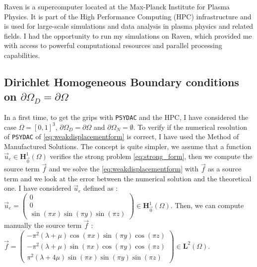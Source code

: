 \documentclass[a4paper,12pt,twoside]{report}
\begin{document}
Raven is a supercomputer located at the Max-Planck Institute for Plasma Physics. It is part of the High Performance Computing (HPC) infrastructure and is used for large-scale simulations and data analysis in plasma physics and related fields. I had the opportunity to run my simulations on Raven, which provided me with access to powerful computational resources and parallel processing capabilities. 


\subsection{Dirichlet Homogeneous Boundary conditions on $\partial\Omega_D = \partial\Omega$} \label{subsec:Dirichlet Homogeneous Boundary conditions on}

In a first time, to get the grips with \texttt{PSYDAC} and the HPC, I have considered the case $\Omega = [0,1]^3$, $\partial \Omega_D = \partial\Omega$ and $\partial \Omega_N = \emptyset$. To verify if the numerical resolution of \texttt{PSYDAC} of \eqref{eq:weakdisplacementform} is correct, I have used the Method of Manufactured Solutions. The concept is quite simpler, we assume that a function $\vec u_e \in \boldsymbol H^1_{\vec 0}(\Omega)$ verifies the strong problem \eqref{eq:strong_form}, then we compute the source term $\vec f$ and we solve the \eqref{eq:weakdisplacementform} with $\vec f$ as a source term and we look at the error between the numerical solution and the theoretical one.
I have considered $\vec u_e$ defined as : $\vec u_e = \begin{pmatrix}
    0 \\
    0 \\
\sin{\left(\pi x \right)} \sin{\left(\pi y \right)} \sin{\left(\pi z \right)}
\end{pmatrix} \in \boldsymbol H^1_{\vec 0}(\Omega).$ Then, we can compute manually the source term $\vec f$ : $\vec f = \begin{pmatrix}
     - \pi^{2} \left(\lambda + \mu\right) \cos{\left(\pi x \right)} \sin{\left(\pi y \right)}  \cos{\left(\pi z \right)} \\
     - \pi^{2} \left(\lambda + \mu\right) \sin{\left(\pi x \right)} \cos{\left(\pi y \right)} \cos{\left(\pi z \right)} \\
      \pi^{2} \left(\lambda + 4 \mu\right) \sin{\left(\pi x \right)} \sin{\left(\pi y \right)} \sin{\left(\pi z \right)}
\end{pmatrix} \in \boldsymbol L^2(\Omega).$
\end{document}
